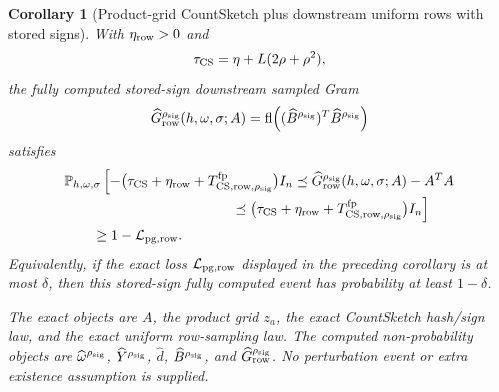 \documentclass[11pt]{article}
\newcommand{\Prob}{\mathbb{P}}
\newcommand{\fl}{\operatorname{fl}}
\newcommand{\I}{I}
\newtheorem{corollary}[theorem]{Corollary}
\theoremstyle{remark}
\begin{document}
\begin{corollary}[Product-grid CountSketch plus downstream uniform rows with stored signs]
With \(\eta_{\rm row}>0\) and
\[
  \tau_{\rm CS}=\eta+L(2\rho+\rho^2),
\]
the fully computed stored-sign downstream sampled Gram
\[
  \widehat G_{\rm row}^{\rho_{\rm sig}}(h,\omega,\sigma;A)
  =
  \fl\!\left(
    (\widehat B^{\rho_{\rm sig}})^T
    \widehat B^{\rho_{\rm sig}}
  \right)
\]
satisfies
\[
\begin{aligned}
&\Prob_{h,\omega,\sigma}
  \left[
    -\bigl(\tau_{\rm CS}+\eta_{\rm row}
      +T_{{\rm CS,row},\rho_{\rm sig}}^{\rm fp}\bigr)\I_n
    \preceq
    \widehat G_{\rm row}^{\rho_{\rm sig}}(h,\omega,\sigma;A)-A^TA
  \right.
\\[-2pt]
&\left.\hspace{4.2cm}
    \preceq
    \bigl(\tau_{\rm CS}+\eta_{\rm row}
      +T_{{\rm CS,row},\rho_{\rm sig}}^{\rm fp}\bigr)\I_n
  \right]
\\
&\qquad\ge
  1-\mathcal L_{\rm pg,row}.
\end{aligned}
\]
Equivalently, if the exact loss \(\mathcal L_{\rm pg,row}\) displayed in the
preceding corollary is at most \(\delta\), then this stored-sign fully
computed event has probability at least \(1-\delta\).

The exact objects are \(A\), the product grid \(z_a\), the exact CountSketch
hash/sign law, and the exact uniform row-sampling law.  The computed
non-probability objects are \(\widehat\omega^{\rho_{\rm sig}}\),
\(\widehat Y^{\rho_{\rm sig}}\), \(\widehat d\),
\(\widehat B^{\rho_{\rm sig}}\), and
\(\widehat G_{\rm row}^{\rho_{\rm sig}}\).  No perturbation event or
extra existence assumption is supplied.


\end{corollary}
\end{document}
